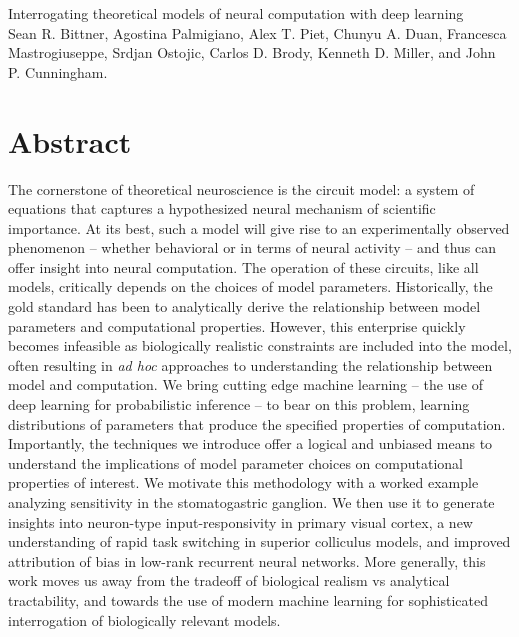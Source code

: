 \documentclass[11pt]{article}
\begin{document}
\medskip                        %

\thispagestyle{plain}
{\Large Interrogating theoretical models of neural computation with deep learning} \\
Sean R. Bittner, Agostina Palmigiano, Alex T. Piet, Chunyu A. Duan, Francesca Mastrogiuseppe, Srdjan Ostojic, Carlos D. Brody, Kenneth D. Miller, and John P. Cunningham.

\linenumbers
\section{Abstract}
The cornerstone of theoretical neuroscience is the circuit model: a system of equations that captures a hypothesized neural mechanism of scientific importance.  
At its best, such a model will give rise to an experimentally observed phenomenon -- whether behavioral or in terms of neural activity -- and thus can offer insight into neural computation.  
The operation of these circuits, like all models, critically depends on the choices of model parameters.  
Historically, the gold standard has been to analytically derive the relationship between model parameters and computational properties.  
However, this enterprise quickly becomes infeasible as biologically realistic constraints are included into the model, often resulting in \emph{ad hoc} approaches to understanding the relationship between model and computation.  
We bring cutting edge machine learning -- the use of deep learning for probabilistic inference -- to bear on this problem, learning distributions of parameters that produce the specified properties of computation.   
Importantly, the techniques we introduce offer a logical and unbiased means to understand the implications of model parameter choices on computational properties of interest.  
We motivate this methodology with a worked example analyzing sensitivity in the stomatogastric ganglion.  We then use it to generate insights into neuron-type input-responsivity in primary visual cortex, a new understanding of rapid task switching in superior colliculus models, and improved attribution of bias in low-rank recurrent neural networks. 
More generally, this work moves us away from the tradeoff of biological realism vs analytical tractability, and towards the use of modern machine learning for sophisticated interrogation of biologically relevant models.
\end{document}
